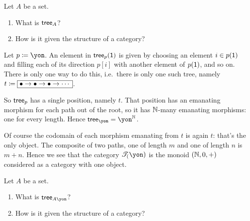 \documentclass[DynamicalBook]{subfiles}
\begin{document}
\begin{exercise}
Let $A$ be a set.
\begin{enumerate}
	\item What is $\mathsf{tree}_A$? 
	\item How is it given the structure of a category?
\qedhere
\end{enumerate}
\end{exercise}

\begin{example}
Let $p\coloneqq\yon$. An element in $\mathsf{tree}_p(\textsf{1})$ is given by choosing an element $i\in p(\textsf{1})$ and filling each of its direction $p[i]$ with another element of $p(\textsf{1})$, and so on. There is only one way to do this, i.e.\ there is only one such tree, namely $t\coloneqq\fbox{$\bullet\to\bullet\to\bullet\to\cdots$}$.

So $\mathsf{tree}_p$ has a single position, namely $t$. That position has an emanating morphism for each path out of the root, so it has $\mathbb{N}$-many emanating morphisms: one for every length. Hence $\tr_\yon=\yon^\nn$.

Of course the codomain of each morphism emanating from $t$ is again $t$: that's the only object. The composite of two paths, one of length $m$ and one of length $n$ is $m+n$. Hence we see that the category $\cofree(\yon)$ is the monoid $(\mathbb{N},0,+)$ considered as a category with one object.
\end{example}

\begin{exercise}
Let $A$ be a set.
\begin{enumerate}
	\item What is $\tr_{A\yon}$? 
	\item How is it given the structure of a category?
\qedhere
\end{enumerate}
\end{exercise}
\end{document}
